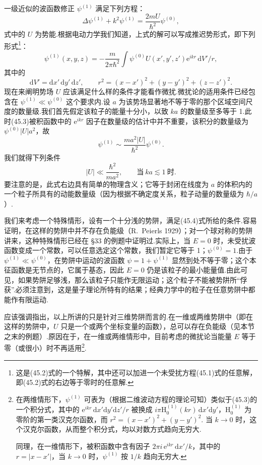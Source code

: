 一级近似的波函数修正 $\psi^{(1)}$ 满足下列方程：
\begin{equation}
  \Delta\psi^{(1)}+k^2\psi^{(1)}=\frac{2mU}{\hbar^2}\psi^{(0)},
\end{equation}
式中的 $U$ 为势能.根据电动力学我们知道，上式的解可以写成推迟势形式，即下列形式\footnote{这是(45.2)式的一个特解，其中还可以加进一个未受扰方程(45.1)式的任意解，即(45.2)式的右边等于零时的任意解.}：
\begin{equation}
  \psi^{(1)}(x,y,z)=-\frac{m}{2\pi\hbar^2}
  \int\psi^{(0)}U(x',y',z')\mathrm{e}^{ikr}\,\mathrm{d}V'/r,
\end{equation}
其中的
\begin{equation*}
  \mathrm{d}V'=\mathrm{d}x'\,\mathrm{d}y'\,\mathrm{d}z',\qquad
  r^2=\left(x-x'\right)^2+\left(y-y'\right)^2+\left(z-z'\right)^2.
\end{equation*}
现在来阐明势场 $U$ 应该满足什么样的条件才能看作微扰.微扰论的适用条件已经包含在 $\psi^{(1)}\ll\psi^{(0)}$ 这个要求内.设 $a$ 为该势场显著地不等于零的那个区域空间尺度的数量级.我们首先假定该粒子的能量十分小，以致 $ka$ 的数量级至多等于 1.此时(45.3)被积函数中的 $\mathrm{e}^{ikr}$ 因子在数量级的估计中并不重要，该积分的数量级为 $\psi^{(0)}|U|a^2$，故
\begin{equation*}
  \psi^{(1)}\sim\frac{ma^2|U|}{\hbar^2}\psi^{(0)}.
\end{equation*}
我们就得下列条件
\begin{equation}
  |U|\ll\frac{\hbar^2}{ma^2},\qquad\text{当}\ ka\lesssim1\ \text{时}.
\end{equation}
要注意的是，此式右边具有简单的物理含义；它等于封闭在线度为 $a$ 的体积内的一个粒子所具有的动能数量级（因为根据不确定度关系，粒子动量的数量级为 $\hbar/a$）.

我们来考虑一个特殊情形，设有一个十分浅的势阱，满足(45.4)式所给的条件.容易证明，在这样的势阱中并不存在负能级（R.~Peierls 1929）；对一个球对称的势阱讲来，这种特殊情形已经在 §33 的例题中证明过.实际上，当 $E=0$ 时，未受扰波函数变成一个常数，可以任意选定这个常数，我们暂定它等于 1；$\psi^{(0)}=1$.由于 $\psi^{(1)}\ll\psi^{(0)}$，在势阱中运动的波函数 $\psi=1+\psi^{(1)}$ 显然到处不等于零；这个本征函数是无节点的，它属于基态，因此 $E=0$ 仍是该粒子的最小能量值.由此可见，如果势阱足够浅，那么该粒子只能作无限运动；这个粒子不能被势阱所“俘获”.必须注意到，这是量子理论所特有的结果；经典力学中的粒子在任意势阱中都能作有限运动.

应该强调指出，以上所讲的只是针对三维势阱而言的.在一维或两维势阱中（即在这样的势阱中，$U$ 只是一个或两个坐标变量的函数），总可以存在负能级（见本节之末的例题）.原因在于，在一维或两维情形中，目前考虑的微扰论当能量 $E$ 等于零（或很小）时不再适用\footnote{在两维情形下，$\psi^{(1)}$ 可表为（根据二维波动方程的理论可知）类似于(45.3)的一个积分式，其中的 $\mathrm{e}^{ikr}\,\mathrm{d}x'\mathrm{d}y'\mathrm{d}z'/r$ 被换成 $i\pi\mathrm{H}_0^{(1)}(kr)\,\mathrm{d}x'\mathrm{d}y'$，$\mathrm{H}_0^{(1)}$ 为零阶的第一类汉克尔函数，而 $r^2=(x-x')^2+(y-y')^2$. 当 $k\to0$ 时，这个汉克尔函数，从而整个积分式，均以对数方式趋向无穷大.

同理，在一维情形下，被积函数中含有因子 $2\pi i\,\mathrm{e}^{ikr}\,\mathrm{d}x'/k$，其中的 $r=|x-x'|$，当 $k\to0$ 时，$\psi^{(1)}$ 按 $1/k$ 趋向无穷大.}.

